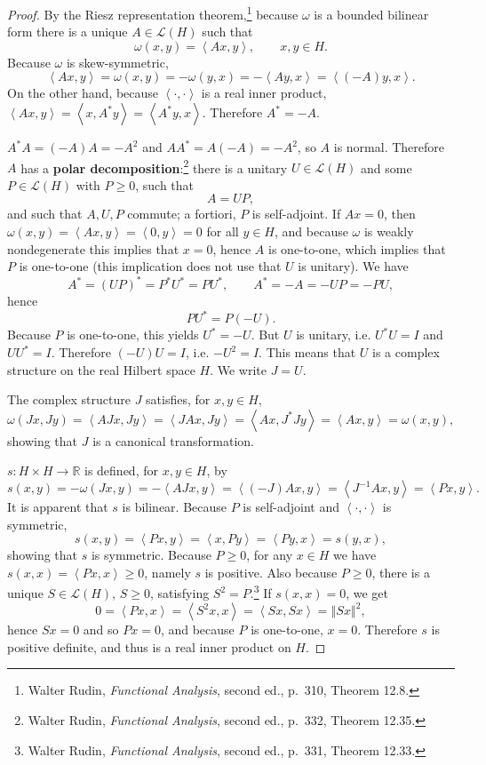 \documentclass{article}
\newcommand{\inner}[2]{\left\langle #1, #2 \right\rangle}
\newcommand{\norm}[1]{\left\Vert #1 \right\Vert}
\theoremstyle{definition}
\begin{document}
\begin{proof}
By the Riesz representation theorem,\footnote{Walter Rudin,
{\em Functional Analysis}, second ed., p.~310, Theorem 12.8.}
because $\omega$ is a bounded bilinear form there is a unique $A \in \mathscr{L}(H)$ such that
\begin{equation}
\omega(x,y) = \inner{Ax}{y}, \qquad x,y \in H.
\label{riesz}
\end{equation}
Because $\omega$ is skew-symmetric,
\[
\inner{Ax}{y} = \omega(x,y) = -\omega(y,x) = -\inner{Ay}{x} = \inner{(-A)y}{x}.
\]
On the other hand, because $\inner{\cdot}{\cdot}$ is a real inner product,
 $\inner{Ax}{y}=\inner{x}{A^*y}=\inner{A^*y}{x}$. Therefore $A^*=-A$. 

$A^*A = (-A)A=-A^2$ and $AA^*=A(-A)=-A^2$, so $A$ is normal. 
Therefore $A$ has a \textbf{polar decomposition}:\footnote{Walter Rudin,
{\em Functional Analysis}, second ed., p.~332, Theorem 12.35.}
there is a unitary $U \in \mathscr{L}(H)$ and some $P \in \mathscr{L}(H)$ with
$P \geq 0$,
 such that
\[
A=UP,
\]
and such that $A,U,P$ commute; a fortiori, $P$ is self-adjoint.
If $Ax=0$, then $\omega(x,y)=\inner{Ax}{y}=\inner{0}{y}=0$ for all $y \in H$, and because $\omega$ is weakly nondegenerate this implies
that $x=0$, hence $A$ is one-to-one, which implies that $P$ is one-to-one (this implication
does not  use that $U$ is unitary). 
We have
\[
A^*=(UP)^*=P^*U^*=PU^*, \qquad A^*=-A=-UP=-PU,
\]
hence
\[
PU^*=P(-U).
\]
Because $P$ is one-to-one, this yields $U^*=-U$.
But $U$ is unitary, i.e. $U^*U=I$ and $UU^*=I$. 
Therefore $(-U)U=I$, i.e. $-U^2=I$. 
This means that $U$ is a complex structure on the real Hilbert space $H$. We write $J=U$.

The complex structure $J$ satisfies, for $x,y \in H$,
\[
\omega(Jx,Jy) = \inner{AJx}{Jy} = \inner{JAx}{Jy} = \inner{Ax}{J^*Jy}
=\inner{Ax}{y}=\omega(x,y),
\]
showing that $J$ is a canonical transformation.

$s:H \times H \to \mathbb{R}$ is defined, for $x,y \in H$, by
\[
s(x,y) = -\omega(Jx,y) = -\inner{AJx}{y} = \inner{(-J)Ax}{y}=
\inner{J^{-1}Ax}{y}
=\inner{Px}{y}.
\]
It is apparent that $s$ is bilinear. Because $P$ is self-adjoint and $\inner{\cdot}{\cdot}$ is symmetric,
\[
s(x,y) = \inner{Px}{y} = \inner{x}{Py} = \inner{Py}{x} = s(y,x),
\]
showing that $s$ is symmetric.
Because $P \geq 0$, for any $x \in H$ we have $s(x,x)=\inner{Px}{x} \geq 0$, namely $s$ is positive.
Also because $P \geq 0$, there is a unique $S \in \mathscr{L}(H)$, $S \geq 0$, satisfying
$S^2=P$.\footnote{Walter Rudin, {\em Functional Analysis}, second ed.,
p.~331, Theorem 12.33.}
If $s(x,x)=0$, we get
\[
0=\inner{Px}{x}=\inner{S^2x}{x}=\inner{Sx}{Sx}=\norm{Sx}^2,
\]
hence $Sx=0$ and so $Px=0$, and because $P$ is one-to-one, $x=0$.
Therefore
$s$ is positive definite, and thus is a real inner product on $H$. 


\end{proof}
\end{document}
